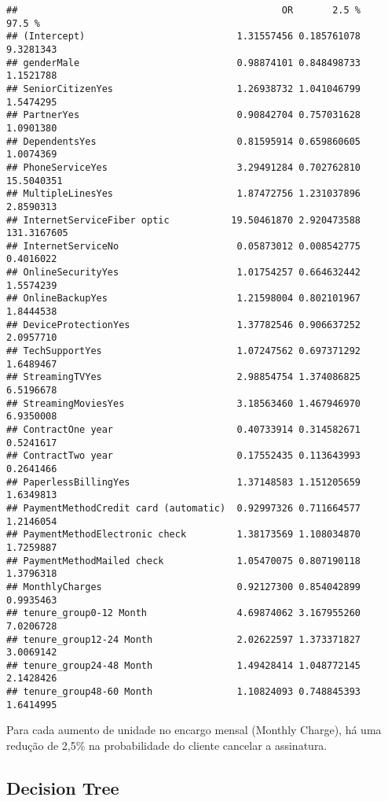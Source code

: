 \documentclass[]{article}
\begin{document}
\begin{verbatim}
##                                               OR       2.5 %      97.5 %
## (Intercept)                           1.31557456 0.185761078   9.3281343
## genderMale                            0.98874101 0.848498733   1.1521788
## SeniorCitizenYes                      1.26938732 1.041046799   1.5474295
## PartnerYes                            0.90842704 0.757031628   1.0901380
## DependentsYes                         0.81595914 0.659860605   1.0074369
## PhoneServiceYes                       3.29491284 0.702762810  15.5040351
## MultipleLinesYes                      1.87472756 1.231037896   2.8590313
## InternetServiceFiber optic           19.50461870 2.920473588 131.3167605
## InternetServiceNo                     0.05873012 0.008542775   0.4016022
## OnlineSecurityYes                     1.01754257 0.664632442   1.5574239
## OnlineBackupYes                       1.21598004 0.802101967   1.8444538
## DeviceProtectionYes                   1.37782546 0.906637252   2.0957710
## TechSupportYes                        1.07247562 0.697371292   1.6489467
## StreamingTVYes                        2.98854754 1.374086825   6.5196678
## StreamingMoviesYes                    3.18563460 1.467946970   6.9350008
## ContractOne year                      0.40733914 0.314582671   0.5241617
## ContractTwo year                      0.17552435 0.113643993   0.2641466
## PaperlessBillingYes                   1.37148583 1.151205659   1.6349813
## PaymentMethodCredit card (automatic)  0.92997326 0.711664577   1.2146054
## PaymentMethodElectronic check         1.38173569 1.108034870   1.7259887
## PaymentMethodMailed check             1.05470075 0.807190118   1.3796318
## MonthlyCharges                        0.92127300 0.854042899   0.9935463
## tenure_group0-12 Month                4.69874062 3.167955260   7.0206728
## tenure_group12-24 Month               2.02622597 1.373371827   3.0069142
## tenure_group24-48 Month               1.49428414 1.048772145   2.1428426
## tenure_group48-60 Month               1.10824093 0.748845393   1.6414995
\end{verbatim}

Para cada aumento de unidade no encargo mensal (Monthly Charge), há uma
redução de 2,5\% na probabilidade do cliente cancelar a assinatura.

\hypertarget{decision-tree}{%
\subsection{Decision Tree}\label{decision-tree}}
\end{document}
